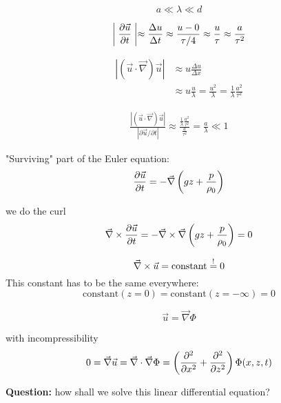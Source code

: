 \begin{equation}
a\ll\lambda\ll d
\end{equation}

\begin{equation}
\biggm\vert\frac{\partial \vec{u}}{\partial t}\biggm\vert \approx \frac{\Delta u}{\Delta t} \approx \frac{u-0}{\tau/4} \approx \frac{u}{\tau} \approx \frac{a}{\tau^2}
\end{equation}

\begin{align}
|(\vec{u}\cdot\vec{\nabla})\vec{u}| &\approx u\frac{\Delta u}{\Delta x}\\
&\approx u\frac{u}{\lambda}=\frac{u^2}{\lambda} = \frac{1}{\lambda}\frac{a^2}{\tau^2}
\end{align}

\begin{align}
\frac{|(\vec{u}\cdot\vec{\nabla})\vec{u}|}{|\partial \vec{u}/\partial t|} \approx \frac{\frac{1}{\lambda}\frac{a^2}{\tau^2}}{\frac{a}{\tau^2}} = \frac{a}{\lambda} \ll 1
\end{align}

"Surviving" part of the Euler equation:
\begin{equation}
\frac{\partial \vec{u}}{\partial t}=-\vec{\nabla}\left(gz+\frac{p}{\rho_0}\right)
\end{equation}

we do the curl
\begin{equation}
\vec{\nabla}\times\frac{\partial \vec{u}}{\partial t}=-\vec{\nabla}\times\vec{\nabla}\left(gz+\frac{p}{\rho_0}\right) = 0
\end{equation}

\begin{equation}
\vec{\nabla}\times\vec{u}=\mathrm{constant}\overset{!}{=}0
\end{equation}
This constant has to be the same everywhere:
\begin{equation}
\mathrm{constant}(z=0) = \mathrm{constant}(z=-\infty)=0
\end{equation}

\begin{equation}
\vec{u}=\vec{\nabla}\Phi
\end{equation}

with incompressibility
\begin{equation}
0=\vec{\nabla}\vec{u}=\vec{\nabla}\cdot\vec{\nabla}\Phi=\left(\frac{\partial^2 }{\partial x^2}+\frac{\partial^2 }{\partial z^2}\right)\Phi(x,z,t)
\end{equation}

\textbf{Question:} how shall we solve this linear differential equation? 

